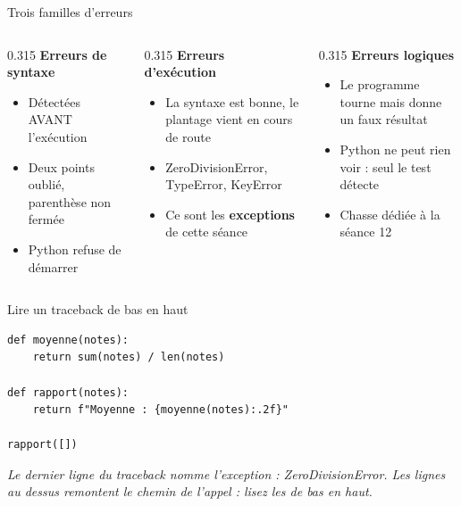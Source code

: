 \documentclass[aspectratio=169,11pt]{beamer}
\begin{document}
\begin{frame}{Trois familles d'erreurs}
\begin{columns}[t]
\begin{column}{0.315\textwidth}
{\bfseries\color{PyBleu}Erreurs de syntaxe}

\begin{itemize}
  \setlength{\itemsep}{1.5pt}\setlength{\parskip}{0pt}
  \item Détectées AVANT l'exécution
  \item Deux points oublié, parenthèse non fermée
  \item Python refuse de démarrer
\end{itemize}
\end{column}
\hspace{0.015\textwidth}
\begin{column}{0.315\textwidth}
{\bfseries\color{PyBleu}Erreurs d'exécution}

\begin{itemize}
  \setlength{\itemsep}{1.5pt}\setlength{\parskip}{0pt}
  \item La syntaxe est bonne, le plantage vient en cours de route
  \item ZeroDivisionError, TypeError, KeyError
  \item Ce sont les \textbf{exceptions} de cette séance
\end{itemize}
\end{column}
\hspace{0.015\textwidth}
\begin{column}{0.315\textwidth}
{\bfseries\color{PyBleu}Erreurs logiques}

\begin{itemize}
  \setlength{\itemsep}{1.5pt}\setlength{\parskip}{0pt}
  \item Le programme tourne mais donne un faux résultat
  \item Python ne peut rien voir : seul le test détecte
  \item Chasse dédiée à la séance 12
\end{itemize}
\end{column}
\end{columns}
\end{frame}

\begin{frame}[fragile]{Lire un traceback de bas en haut}

\begin{lstlisting}[style=py]
def moyenne(notes):
    return sum(notes) / len(notes)

def rapport(notes):
    return f"Moyenne : {moyenne(notes):.2f}"

rapport([])
\end{lstlisting}
\vspace{0.5pt}

{\small\color{PyGris}\itshape Le dernier ligne du traceback nomme l'exception : ZeroDivisionError. Les lignes au dessus remontent le chemin de l'appel : lisez les de bas en haut.}

\end{frame}
\end{document}
